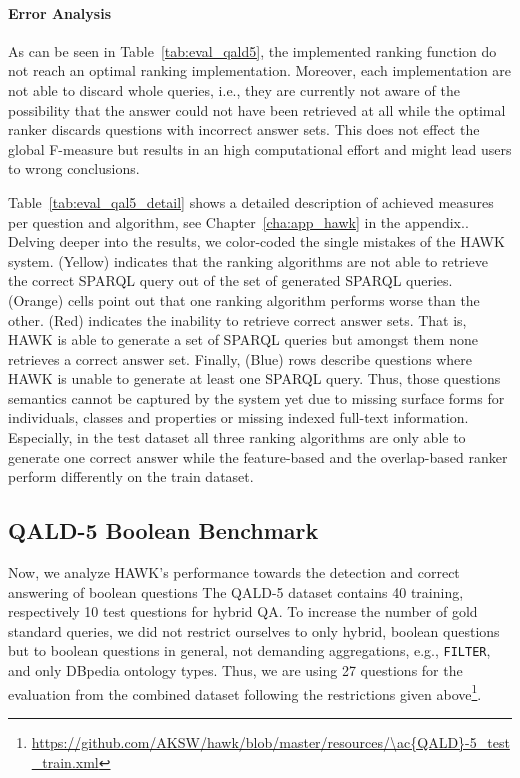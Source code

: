 \paragraph{Error Analysis}
As can be seen in Table~\ref{tab:eval_qald5}, the implemented ranking function do not reach an optimal ranking implementation.
Moreover, each implementation are not able to discard whole queries, i.e., they are currently not aware of the possibility that the answer could not have been retrieved at all while the optimal ranker discards questions with incorrect answer sets. 
This does not effect the global F-measure but results in an high computational effort and might lead users to wrong conclusions. 

Table~\ref{tab:eval_qal5_detail} shows a detailed description of achieved measures per question and algorithm, see Chapter~\ref{cha:app_hawk} in the appendix.. 
Delving deeper into the results, we color-coded the single mistakes of the HAWK system.
(Yellow) indicates that the ranking algorithms are not able to retrieve the correct SPARQL query out of the set of generated SPARQL queries. 
(Orange) cells point out that one ranking algorithm performs worse than the other. 
(Red) indicates the inability to retrieve correct answer sets.
That is, HAWK is able to generate a set of SPARQL queries but amongst them none retrieves a correct answer set.
Finally, (Blue) rows describe questions where HAWK is unable to generate at least one SPARQL query.
Thus, those questions semantics cannot be captured by the system yet due to missing surface forms for individuals, classes and properties or missing indexed full-text information.
Especially, in the test dataset all three ranking algorithms are only able to generate one correct answer while the feature-based and the overlap-based ranker perform differently on the train dataset.



\subsection{QALD-5 Boolean Benchmark}

Now, we analyze HAWK's performance towards the detection and correct answering of boolean questions
The \ac{QALD}-5 dataset contains 40 training, respectively 10 test questions for hybrid \ac{QA}.
To increase the number of gold standard queries, we did not restrict ourselves to only hybrid, boolean questions but to boolean questions in general, not demanding aggregations, e.g., \texttt{FILTER}, and only DBpedia ontology types.
Thus, we are using 27 questions for the evaluation from the combined dataset following the restrictions given above\footnote{\url{https://github.com/AKSW/hawk/blob/master/resources/\ac{QALD}-5_test_train.xml}}.


